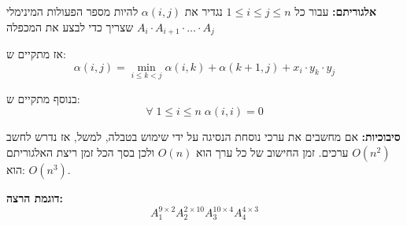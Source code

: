 \textbf{אלגוריתם:}
עבור כל 
$1 \leq i \leq j \leq n$
נגדיר את
$\alpha(i, j)$
להיות מספר הפעולות המינימלי שצריך כדי לבצע את המכפלה
$A_i \cdot A_{i + 1} \cdot \ldots \cdot A_j$

אז מתקיים ש:%
$$
\alpha(i, j) = \min_{i \leq k < j} 
\alpha(i, k) + \alpha(k + 1, j) + x_i \cdot y_k \cdot y_j
$$

בנוסף מתקיים ש:
$$
\forall \; 1 \leq i \leq n \; \alpha(i,i) = 0
$$

\textbf{סיבוכיות:}
אם מחשבים את ערכי נוסחת הנסיגה על ידי שימוש בטבלה, למשל, אז נדרש לחשב
$O(n^2)$
ערכים. 
זמן החישוב של כל ערך הוא 
$O(n)$
ולכן בסך הכל זמן ריצת האלגוריתם הוא:
$O(n^3)$.

\textbf{דוגמת הרצה:}
$$
A_1^{9 \times 2} A_2^{2 \times 10} A_3^{10 \times 4} A_4^{4 \times 3}
$$
